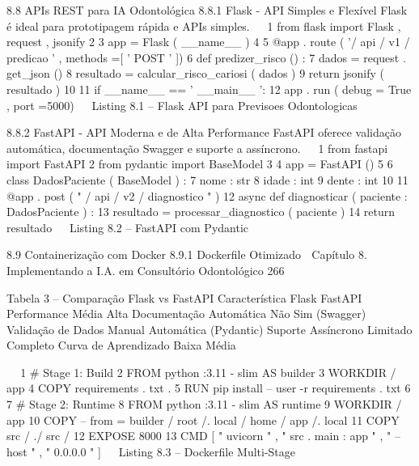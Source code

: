      8.8      APIs REST para IA Odontológica
     8.8.1     Flask - API Simples e Flexível
     Flask é ideal para prototipagem rápida e APIs simples.
                                                                                              
 1   from flask import Flask , request , jsonify
 2
 3   app = Flask ( __name__ )
 4
 5   @app . route ( '/ api / v1 / predicao ' , methods =[ ' POST ' ])
 6   def predizer_risco () :
 7        dados = request . get_json ()
 8        resultado = calcular_risco_cariosi ( dados )
 9        return jsonify ( resultado )
10
11   if __name__ == ' __main__ ':
12       app . run ( debug = True , port =5000)
                                                                                              
                         Listing 8.1 – Flask API para Previsoes Odontologicas


     8.8.2     FastAPI - API Moderna e de Alta Performance
     FastAPI oferece validação automática, documentação Swagger e suporte a assíncrono.
                                                                                              
 1   from fastapi import FastAPI
 2   from pydantic import BaseModel
 3
 4   app = FastAPI ()
 5
 6   class DadosPaciente ( BaseModel ) :
 7       nome : str
 8       idade : int
 9       dente : int
10
11   @app . post ( " / api / v2 / diagnostico " )
12   async def diagnosticar ( paciente : DadosPaciente ) :
13        resultado = processar_diagnostico ( paciente )
14        return resultado
                                                                                              
                                    Listing 8.2 – FastAPI com Pydantic



     8.9      Containerização com Docker
     8.9.1     Dockerfile Otimizado
   Capítulo 8. Implementando a I.A. em Consultório Odontológico                            266


                               Tabela 3 – Comparação Flask vs FastAPI
                     Característica                     Flask            FastAPI
                     Performance                        Média              Alta
                     Documentação Automática             Não          Sim (Swagger)
                     Validação de Dados                Manual      Automática (Pydantic)
                     Suporte Assíncrono                Limitado         Completo
                     Curva de Aprendizado               Baixa             Média

                                                                                                
 1 # Stage 1: Build
 2 FROM python :3.11 - slim AS builder
 3 WORKDIR / app
 4 COPY requirements . txt .
 5 RUN pip install -- user -r requirements . txt
 6
 7 # Stage 2: Runtime
 8 FROM python :3.11 - slim AS runtime
 9 WORKDIR / app
10 COPY -- from = builder / root /. local / home / app /. local
11 COPY src / ./ src /
12 EXPOSE 8000
13 CMD [ " uvicorn " , " src . main : app " , " -- host " , " 0.0.0.0 " ]
                                                                                                
                                   Listing 8.3 – Dockerfile Multi-Stage


